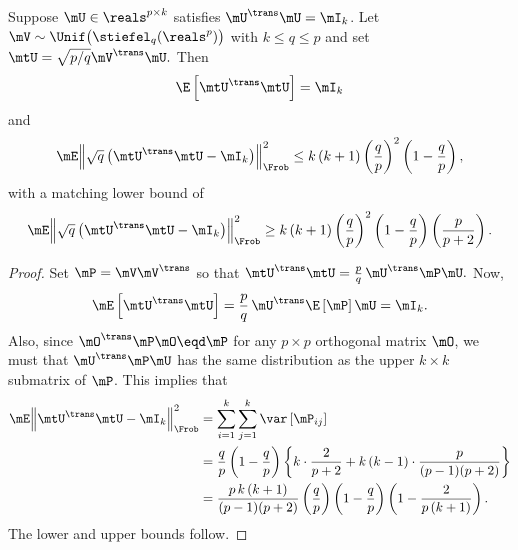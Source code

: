 \begin{lemma}\label{L:project-kframe-dot-products}
    Suppose $\mU \in \reals^{p \times k}$ satisfies $\mU^\trans \mU = \mI_k$.
    Let $\mV \sim \Unif\big( \stiefel_q(\reals^p) \big)$ with 
    $k \leq q \leq p$
    and set
    \(
        \mtU = \sqrt{p/q} \mV^\trans \mU.
    \)
    Then 
    \[
        \E \left[ \mtU^\trans \mtU \right] = \mI_k
    \]
    and
    \[
        \mE \Big\| 
            \sqrt{q} \, \big(  \mtU^\trans \mtU - \mI_k \big) 
        \Big\|_\Frob^2
                \leq
                k \, (k+1)
                \left( \frac{q}{p} \right)^2                
                \left( 1 - \frac{q}{p} \right),
    \]
    with a matching lower bound of
    \[
        \mE \Big\| 
            \sqrt{q} \, \big(  \mtU^\trans \mtU - \mI_k \big) 
        \Big\|_\Frob^2
            \geq
            k \, (k+1)
            \left( \frac{q}{p} \right)^2
            \left( 1 - \frac{q}{p} \right)
            \left(
            \frac{p}{p+2}
            \right).
    \]
\end{lemma}
\begin{proof}
    Set $\mP = \mV \mV^\trans$ so that
    \(
        \mtU^\trans \mtU
        =
        \frac{p}{q} \, 
        \mU^\trans \mP \mU.
    \)
    Now,
    \[
        \mE \left[ \mtU^\trans \mtU \right]
            =
                \frac{p}{q} \,
                \mU^\trans
                \E \left[ \mP \right]
                \mU
            =
            \mI_k.
    \]
    Also, since $\mO^\trans \mP \mO \eqd \mP$ for any $p \times p$ orthogonal
    matrix $\mO$, we must that $\mU^\trans \mP \mU$ has the same distribution
    as the upper $k \times k$ submatrix of $\mP$.  This implies that
    \begin{align*}
        \mE \Big\| 
            \mtU^\trans \mtU - \mI_k
        \Big\|_\Frob^2
            &= \sum_{i=1}^k \sum_{j=1}^k
                     \var \left[ \mP_{ij} \right] \\
            &= \frac{q}{p} \left( 1 - \frac{q}{p} \right)
               \bigg\{ 
                    k \cdot \frac{2}{p + 2} 
                    +
                    k \, (k-1)
                    \cdot
                    \frac{p}{ (p-1) (p+2) }
               \bigg\} \\
            &= 
               \frac{p \, k \, (k+1) }{ (p-1) (p+2) }
               \left( \frac{q}{p} \right) \left( 1 - \frac{q}{p} \right)
               \left(
                    1
                    -
                    \frac{2}{ p \, (k+1) }
               \right).
    \end{align*}
    The lower and upper bounds follow.
\end{proof}

